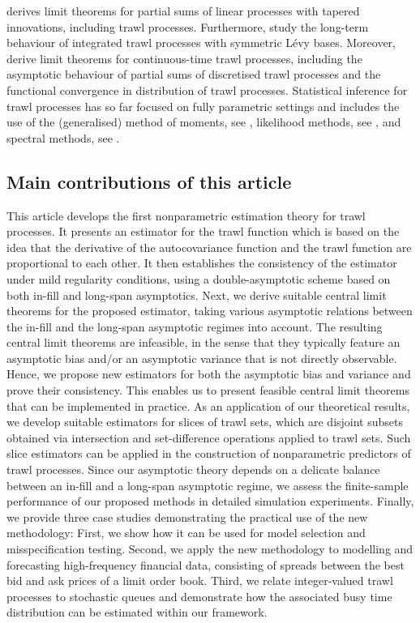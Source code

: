 \documentclass{article}
\theoremstyle{plain}
\theoremstyle{definition}
\theoremstyle{remark}
\begin{document}
derives limit theorems for partial sums of linear processes with tapered innovations, including trawl processes.  
Furthermore, \cite{TalTre2019} study the long-term behaviour of integrated trawl processes with symmetric L\'{e}vy bases. 
Moreover, \cite{PPSV2021}  derive limit theorems for continuous-time trawl processes, including the asymptotic behaviour of partial sums of discretised trawl processes and the functional convergence in distribution of trawl processes. 
Statistical inference for trawl processes has so far focused on fully parametric settings and includes the use of the (generalised) method of moments, see \cite{BNLSV2014, SheYan, VERAART2019},
likelihood methods, see \cite{Noven, Bacro, CourgeauVeraart2022, Shephard2016, BLSV2021}, and spectral methods, see \cite{Doukhan2020}.

\subsection{Main contributions of this article}

This article develops the first  nonparametric estimation theory for trawl processes.
It presents an estimator for the trawl function which is based on the idea that the derivative of the autocovariance function  and the trawl function are proportional to each other.
It then establishes the consistency of the estimator under mild regularity conditions, using a double-asymptotic scheme based on both in-fill and long-span asymptotics. 
Next, we derive suitable central limit theorems for the proposed estimator, taking various asymptotic relations between the in-fill and the long-span asymptotic regimes into account.
The resulting central limit theorems are infeasible, in the sense that they typically feature an asymptotic bias and/or an asymptotic variance that is not directly observable.
Hence, we propose new estimators for both the asymptotic bias and variance and prove their consistency.
This enables us to present feasible central limit theorems that can be implemented in practice.
As an application of our theoretical results, we develop suitable estimators for slices of trawl sets, which are disjoint subsets obtained via intersection and set-difference operations applied to trawl sets. Such slice estimators can be applied in the construction of nonparametric predictors of trawl processes. 
Since our asymptotic theory depends on a delicate balance between an in-fill and a long-span asymptotic regime, we assess the finite-sample performance of our proposed methods in detailed simulation experiments.
Finally, we provide three case studies demonstrating the practical use of the new methodology: First, we show how it can be used for model selection and misspecification testing. Second, we apply the new methodology to modelling and forecasting high-frequency financial data, consisting of spreads between the best bid and ask prices of a limit order book. Third, we relate integer-valued trawl processes to stochastic queues and demonstrate how the associated busy time distribution can be estimated within our framework. 
\end{document}
